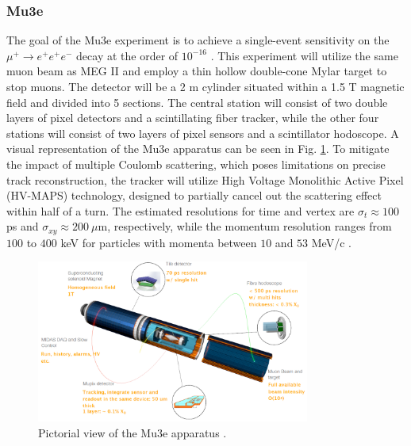 \begin{refsection}
        \subsubsection{Mu3e}
        The goal of the Mu3e experiment is to achieve a single-event sensitivity on the $\mu^+ \rightarrow e^+ e^+e^-$ decay at the order of $10^{-16}$ \cite{Mu3e:2016}. 
        This experiment will utilize the same muon beam as MEG II and employ a thin hollow double-cone Mylar target to stop muons. 
        The detector will be a 2 m cylinder situated within a 1.5 T magnetic field and divided into 5 sections. 
        The central station will consist of two double layers of pixel detectors and a scintillating fiber tracker, while the other four stations will consist of two layers of pixel sensors and a scintillator hodoscope.
        A visual representation of the Mu3e apparatus can be seen in Fig. \ref{_Mu3e_3D}. 
        To mitigate the impact of multiple Coulomb scattering, which poses limitations on precise track reconstruction, the tracker will utilize High Voltage Monolithic Active Pixel (HV-MAPS) technology, designed to partially cancel out the scattering effect within half of a turn. 
        The estimated resolutions for time and vertex are $\sigma_t \approx 100$ ps and $\sigma_{xy} \approx 200\ \mu$m, respectively, while the momentum resolution ranges from $100$ to $400$ keV for particles with momenta between $10$ and $53$ MeV/c \cite{Signorelli}. 
        
        \begin{figure}
            \centering
            \includegraphics[width=0.8\textwidth]{Figures/Introduction/Mu3e_3D.png}
            \caption[cLFV: Mu3e experiment]{Pictorial view of the Mu3e apparatus \cite{Papa}.}
        \label{_Mu3e_3D}
        \end{figure}


\end{refsection}
